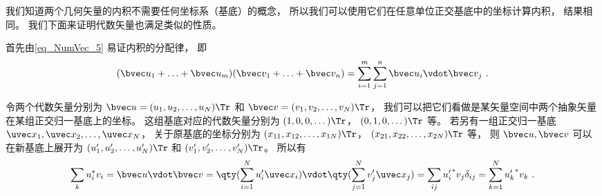 我们知道两个几何矢量的内积不需要任何坐标系（基底）的概念， 所以我们可以使用它们在任意单位正交基底中的坐标计算内积， 结果相同。 我们下面来证明代数矢量也满足类似的性质。

首先由\autoref{eq_NumVec_5} 易证内积的分配律， 即
\begin{equation}
(\bvec u_1 + \ldots + \bvec u_m)(\bvec v_1 + \ldots + \bvec v_n) = \sum_{i=1}^m \sum_{j=1}^n \bvec u_i \vdot \bvec v_j~.
\end{equation}

令两个代数矢量分别为 $\bvec u = (u_1, u_2, \dots, u_N)\Tr$ 和 $\bvec v = (v_1, v_2, \dots, v_N)\Tr$， 我们可以把它们看做是某矢量空间中两个抽象矢量在某组正交归一基底上的坐标。 这组基底对应的代数矢量分别为 $(1, 0, 0, \dots)\Tr$， $(0, 1, 0, \dots)\Tr$ 等。 若另有一组正交归一基底 $\uvec x_1, \uvec x_2, \dots, \uvec x_N$， 关于原基底的坐标分别为 $(x_{11}, x_{12}, \dots, x_{1N})\Tr$， $(x_{21}, x_{22}, \dots, x_{2N})\Tr$ 等， 则 $\bvec u, \bvec v$ 可以在新基底上展开为 $(u'_1, u'_2, \dots, u'_N)\Tr$ 和 $(v'_1, v'_2, \dots, v'_N)\Tr$。 所以有
\begin{equation}
\sum_k u_i^* v_i = \bvec u \vdot \bvec v = \qty(\sum_{i=1}^N u'_i \uvec x_i)\vdot\qty(\sum_{j=1}^N v'_j \uvec x_j) = \sum_{ij} {u'_i}^* v_j \delta_{ij} = \sum_{k=1}^N {u'_k}^* v_k~.
\end{equation}







